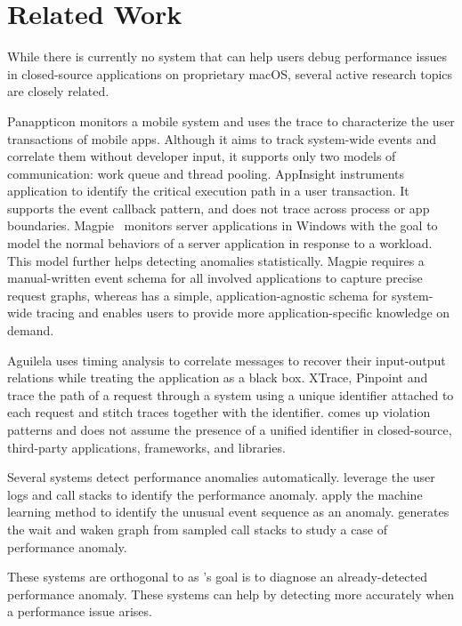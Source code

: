 \section{Related Work}
\label{sec:related-work}

While there is currently no system that can help users debug performance
issues in closed-source applications on proprietary macOS, several active
research topics are closely related.



Panappticon \cite{zhang2013panappticon} monitors a mobile system and uses the
trace to characterize the user transactions of mobile apps. Although it aims to
track system-wide events and correlate them without developer input, it supports
only two models of communication: work queue and thread pooling. AppInsight
\cite{ravindranath2012appinsight} instruments application to identify the
critical execution path in a user transaction. It supports the event callback
pattern, and does not trace across process or app boundaries.
Magpie~\cite{barham2004using} monitors server applications in Windows with the
goal to model the normal behaviors of a server application in response to a
workload. This model further helps detecting anomalies statistically. Magpie
requires a manual-written event schema for all involved applications to capture
precise request graphs, whereas \xxx has a simple, application-agnostic schema
for system-wide tracing and enables users to provide more application-specific
knowledge on demand.

Aguilela \cite{aguilera2003performance} uses timing analysis to correlate
messages to recover their input-output relations while treating the application
as a black box. XTrace, Pinpoint and \etc ~\cite{fonseca2007x, chen2002pinpoint,
chow2014mystery} trace the path of a request through a system using a unique
identifier attached to each request and stitch traces together with the
identifier. \xxx comes up violation patterns and does not assume the presence of
a unified identifier in closed-source, third-party applications, frameworks, and
libraries.


Several systems detect performance
anomalies automatically. \cite{han2012performance, yuan2012conservative}
leverage the user logs and call stacks to identify the performance anomaly.
\cite{cohen2004correlating, saidi2008full, xu2009detecting, du2017deeplog}
apply the machine learning method to identify the unusual event sequence as an
anomaly. \cite{yu2014comprehending} generates the wait and waken graph from
sampled call stacks to study a case of performance anomaly.

These systems are orthogonal to \xxx as \xxx's goal is to diagnose an
already-detected performance anomaly. These systems can help \xxx by detecting
more accurately when a performance issue arises.
